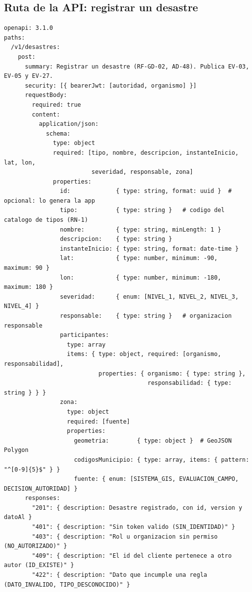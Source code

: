 \documentclass[11pt,letterpaper]{article}
\begin{document}
\subsection{Ruta de la API: registrar un desastre}

\begingroup\footnotesize
\begin{verbatim}
openapi: 3.1.0
paths:
  /v1/desastres:
    post:
      summary: Registrar un desastre (RF-GD-02, AD-48). Publica EV-03, EV-05 y EV-27.
      security: [{ bearerJwt: [autoridad, organismo] }]
      requestBody:
        required: true
        content:
          application/json:
            schema:
              type: object
              required: [tipo, nombre, descripcion, instanteInicio, lat, lon,
                         severidad, responsable, zona]
              properties:
                id:             { type: string, format: uuid }  # opcional: lo genera la app
                tipo:           { type: string }   # codigo del catalogo de tipos (RN-1)
                nombre:         { type: string, minLength: 1 }
                descripcion:    { type: string }
                instanteInicio: { type: string, format: date-time }
                lat:            { type: number, minimum: -90,  maximum: 90 }
                lon:            { type: number, minimum: -180, maximum: 180 }
                severidad:      { enum: [NIVEL_1, NIVEL_2, NIVEL_3, NIVEL_4] }
                responsable:    { type: string }   # organizacion responsable
                participantes:
                  type: array
                  items: { type: object, required: [organismo, responsabilidad],
                           properties: { organismo: { type: string },
                                         responsabilidad: { type: string } } }
                zona:
                  type: object
                  required: [fuente]
                  properties:
                    geometria:        { type: object }  # GeoJSON Polygon
                    codigosMunicipio: { type: array, items: { pattern: "^[0-9]{5}$" } }
                    fuente: { enum: [SISTEMA_GIS, EVALUACION_CAMPO, DECISION_AUTORIDAD] }
      responses:
        "201": { description: Desastre registrado, con id, version y datoAl }
        "401": { description: "Sin token valido (SIN_IDENTIDAD)" }
        "403": { description: "Rol u organizacion sin permiso (NO_AUTORIZADO)" }
        "409": { description: "El id del cliente pertenece a otro autor (ID_EXISTE)" }
        "422": { description: "Dato que incumple una regla (DATO_INVALIDO, TIPO_DESCONOCIDO)" }
\end{verbatim}
\endgroup
\end{document}
